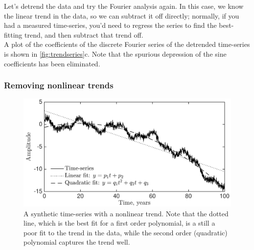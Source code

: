 \documentclass[11pt,twoside,a4paper]{article}
\begin{document}
Let's detrend the data and try the Fourier analysis again.  In this
case, we know the linear trend in the data, so we can subtract it off
directly; normally, if you had a measured time-series, you'd need to
regress the series to find the best-fitting trend, and then subtract
that trend off.
\\[1mm]
A plot of the coefficients of the discrete Fourier series of the
detrended time-series is shown in \autoref{fig:trendseries}c. Note
that the spurious depression of the sine coefficients has been
eliminated. 

\subsubsection{Removing nonlinear trends}

\begin{figure}
  \centering
  \includegraphics[width=4.5in]{../figs/L16/QuadDetrend}
  \caption{A synthetic time-series with a nonlinear trend.  Note that
    the dotted line, which is the best fit for a first order
    polynomial, is a still a poor fit to the trend in the data, while
    the second order (quadratic) polynomial captures the trend
    well. \vspace{0.1cm}}
  \label{fig:quad}
\end{figure}
\end{document}

